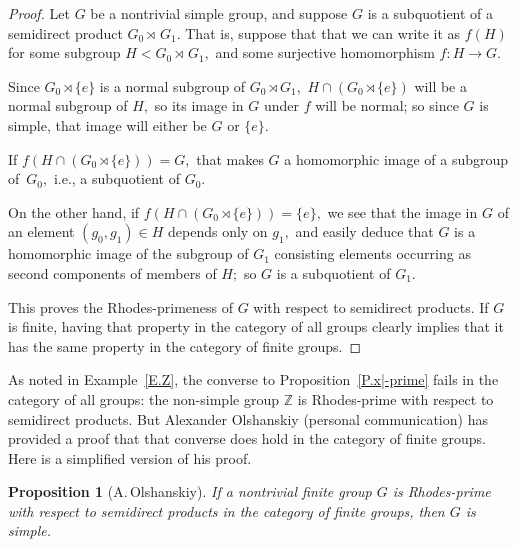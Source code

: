 \documentclass{amsart}
\newtheorem{proposition}[theorem]{Proposition}
\numberwithin{equation}{section}
\numberwithin{theorem}{section}
\newcommand{\Z}{\mathbb{Z}}
\begin{document}
\begin{proof}
Let $G$ be a nontrivial simple group, and suppose
$G$ is a subquotient of a semidirect product $G_0\rtimes\,G_1.$
That is, suppose that that we can write it as $f(H)$ for some subgroup
$H<G_0\rtimes\,G_1,$ and some surjective homomorphism $f:H\to G.$

Since $G_0\rtimes\{e\}$ is a normal subgroup of $G_0\rtimes G_1,$
$H\cap(G_0\rtimes\{e\})$ will be a normal subgroup of $H,$
so its image in $G$ under $f$ will be normal; so
since $G$ is simple, that image will either be $G$ or $\{e\}.$

If $f(H\cap(G_0\rtimes\{e\}))=G,$ that makes $G$ a homomorphic
image of a subgroup of~$G_0,$ i.e., a subquotient of $G_0.$

On the other hand, if $f(H\cap(G_0\rtimes\{e\}))=\{e\},$
we see that the image in $G$ of an element
$(g_0,g_1)\in H$ depends only on $g_1,$ and easily deduce that
$G$ is a homomorphic image of the subgroup of $G_1$ consisting
elements occurring as second components of members of $H;$
so $G$ is a subquotient of $G_1.$

This proves the Rhodes-primeness of $G$ with
respect to semidirect products.
If $G$ is finite, having that property in the category of
all groups clearly implies that it has the same property in the
category of finite groups.
\end{proof}

As noted in Example~\ref{E.Z}, the converse to
Proposition~\ref{P.x|-prime} fails in the category of all groups:
the non-simple group $\Z$ is Rhodes-prime with
respect to semidirect products.
But Alexander Olshanskiy (personal communication) has provided
a proof that
that converse does hold in the category of finite groups.
Here is a simplified version of his proof.

\begin{proposition}[A.\,Olshanskiy]\label{P.AO_simple}
If a nontrivial finite group $G$ is Rhodes-prime with
respect to semidirect products in the category of
finite groups, then $G$ is simple.
\end{proposition}
\end{document}
